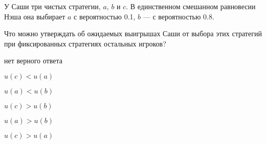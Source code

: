 
\begin{question}
У Саши три чистых стратегии, \(a\), \(b\) и \(c\). В единственном
смешанном равновесии Нэша она выбирает \(a\) с вероятностью 0.1, \(b\)
--- с вероятностью 0.8.

Что можно утверждать об ожидаемых выигрышах Саши от выбора этих
стратегий при фиксированных стратегиях остальных игроков?
\begin{answerlist}
  \item нет верного ответа
  \item \(u(c) < u(a)\)
  \item \(u(a) < u(b)\)
  \item \(u(c) > u(b)\)
  \item \(u(a) > u(b)\)
  \item \(u(c) > u(a)\)
\end{answerlist}
\end{question}



